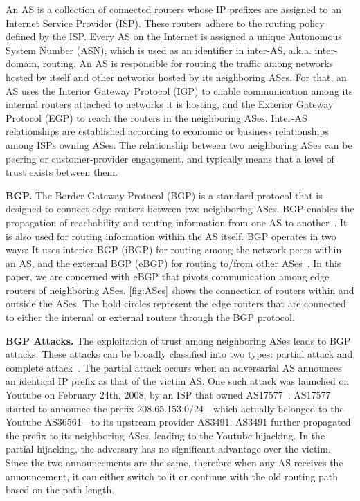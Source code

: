 \documentclass[5p]{elsarticle}
\newcommand{\BfPara}[1]{{\noindent\bf#1.}\xspace}
\begin{document}
An AS is a collection of connected routers whose IP prefixes are assigned to an Internet Service Provider (ISP). These routers adhere to the routing policy defined by the ISP. Every AS on the Internet is assigned a unique Autonomous System Number (ASN), which is used as an identifier in inter-AS, a.k.a. inter-domain, routing. An AS is responsible for routing the traffic among networks hosted by itself and other networks hosted by its neighboring ASes. For that, an AS uses the Interior Gateway Protocol (IGP) to enable communication among its internal routers attached to networks it is hosting, and the Exterior Gateway Protocol (EGP) to reach the routers in the neighboring ASes. Inter-AS relationships are established according to economic or business relationships among ISPs owning ASes. The relationship between two neighboring ASes can be peering or customer-provider engagement, and typically means that a level of trust exists between them.  


\BfPara{BGP}
The Border Gateway Protocol (BGP) is a standard protocol that is designed to connect edge routers between two neighboring ASes. BGP enables the propagation of reachability and routing information from one AS to another~\cite{rfc4271}. It is also used for routing information within the AS itself. BGP operates in two ways: It uses interior BGP (iBGP) for routing among the network peers within an AS, and the external BGP (eBGP) for routing to/from other ASes~\cite{rfc4271,SmithG96}. In this paper, we are concerned with eBGP that pivots communication among edge routers of neighboring ASes. \autoref{fig:ASes} shows the connection of routers within and outside the ASes. The bold circles represent the edge routers that are connected to either the internal or external routers through the BGP protocol. %

\BfPara{BGP Attacks}\label{bgp:attacks}
The exploitation of trust among neighboring ASes leads to BGP attacks. These attacks can be broadly classified into two types: partial attack and complete attack~\cite{BGPHijack}. The partial attack occurs when an adversarial AS announces an identical IP prefix as that of the victim AS. One such attack was launched on Youtube on February 24th, 2008, by an ISP that owned AS17577~\cite{BiersackJFFTTTV12,WongS11}. AS17577 started to announce the prefix 208.65.153.0/24---which actually belonged to the Youtube AS36561---to its upstream provider AS3491. AS3491 further propagated the prefix to its neighboring ASes, leading to the Youtube hijacking. In the partial hijacking, the adversary has no significant advantage over the victim. Since the two announcements are the same, therefore when any AS receives the announcement, it can either switch to it or continue with the old routing path based on the path length. 
\end{document}
